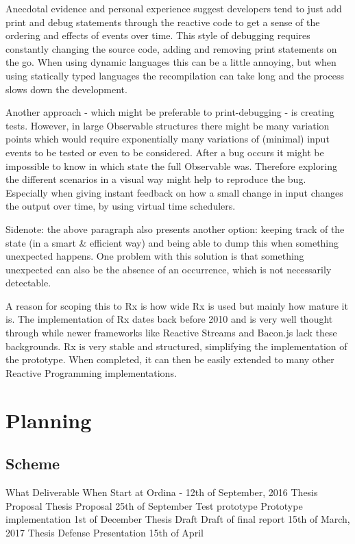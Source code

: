 \documentclass[11pt,a4paper]{article}
\begin{document}
Anecdotal evidence and personal experience suggest developers tend to just add print and debug statements through the reactive code to get a sense of the ordering and effects of events over time. This style of debugging requires constantly changing the source code, adding and removing print statements on the go. When using dynamic languages this can be a little annoying, but when using statically typed languages the recompilation can take long and the process slows down the development.

Another approach - which might be preferable to print-debugging - is creating tests. However, in large Observable structures there might be many variation points which would require exponentially many variations of (minimal) input events to be tested or even to be considered. After a bug occurs it might be impossible to know in which state the full Observable was. Therefore exploring the different scenarios in a visual way might help to reproduce the bug. Especially when giving instant feedback on how a small change in input changes the output over time, by using virtual time schedulers. 

Sidenote: the above paragraph also presents another option: keeping track of the state (in a smart \& efficient way) and being able to dump this when something unexpected happens. One problem with this solution is that something unexpected can also be the absence of an occurrence, which is not necessarily detectable.

A reason for scoping this to Rx is how wide Rx is used but mainly how mature it is. The implementation of Rx dates back before 2010 and is very well thought through while newer frameworks like Reactive Streams and Bacon.js lack these backgrounds. Rx is very stable and structured, simplifying the implementation of the prototype. When completed, it can then be easily extended to many other Reactive Programming implementations.

\section{Planning}

\subsection{Scheme}

What
Deliverable
When
Start at Ordina
-
12th of September, 2016
Thesis Proposal
Thesis Proposal
25th of September
Test prototype
Prototype implementation
1st of December
Thesis Draft
Draft of final report
15th of March, 2017
Thesis Defense
Presentation
15th of April
\end{document}
